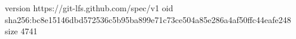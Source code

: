 version https://git-lfs.github.com/spec/v1
oid sha256:bc8e15146dbd572536c5b95ba899e71c73ce504a85e286a4af50ffc44eafe248
size 4741
